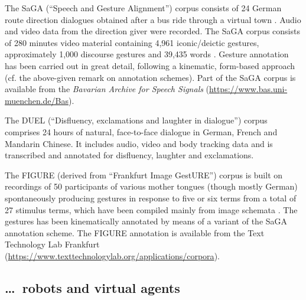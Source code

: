 \documentclass[output=paper]{langsci/langscibook}
\begin{document}
The SaGA (\enquote{Speech and Gesture Alignment}) corpus  consists of 24 German route direction dialogues obtained after a bus ride through a virtual town \citep{Luecking:Bergmann:Hahn:Kopp:Rieser:2010}. 
%
Audio and video data from the direction giver were recorded. 
%
The SaGA corpus consists of 280 minutes video material containing 4,961 iconic/deictic gestures, approximately 1,000 discourse gestures and 39,435 words \citep{Luecking:Bergmann:Hahn:Kopp:Rieser:2013}.
%
Gesture annotation has been carried out in great detail, following a kinematic, form-based approach (cf. the above-given remark on annotation schemes).
%
Part of the SaGA corpus is available from the \textit{Bavarian Archive for Speech Signals} (\url{https://www.bas.uni-muenchen.de/Bas}).


The DUEL (\enquote{Disfluency, exclamations and laughter in dialogue}) corpus  \citep{Hough:Tian:de:Ruiter:Betz:Kousidis:Schlangen:Ginzburg:2016} comprises 24 hours of natural, face-to-face dialogue in German, French and Mandarin Chinese.
%
It includes audio, video and body tracking data and is transcribed and annotated for disfluency, laughter and exclamations.


The FIGURE (derived from \enquote{Frankfurt Image GestURE}) corpus  \citep{Luecking:Mehler:Walther:Mauri:Kurfuerst:2016} is built on recordings of 50 participants of various mother tongues (though mostly German) spontaneously producing gestures in response to five or six terms from a total of 27 stimulus terms, which have been compiled mainly from image schemata \citep{Lakoff87a-u}.
%
The gestures has been kinematically annotated by means of a variant of the SaGA annotation scheme.
%
The FIGURE annotation is available from the Text Technology Lab Frankfurt (\url{https://www.texttechnologylab.org/applications/corpora}).



\subsection{\ldots\ robots and virtual agents}
\label{sec:virtual-agents}
\end{document}
